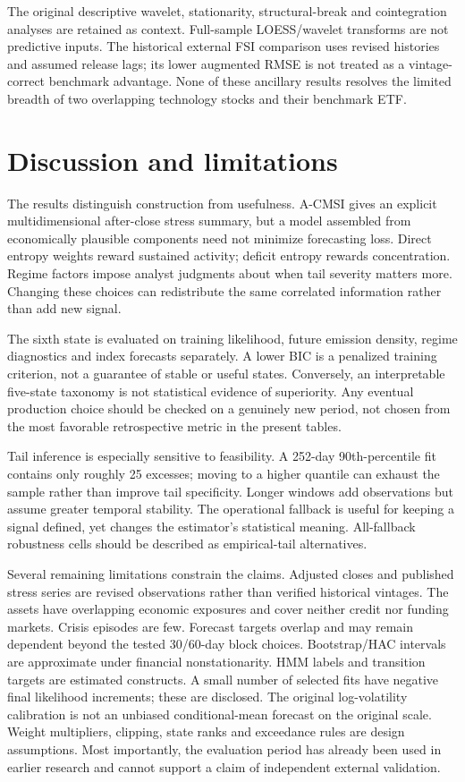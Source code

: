 \documentclass[11pt]{article}
\begin{document}
The original descriptive wavelet, stationarity, structural-break and cointegration analyses are
retained as context. Full-sample LOESS/wavelet transforms are not predictive inputs. The historical
external FSI comparison uses revised histories and assumed release lags; its lower augmented RMSE
is not treated as a vintage-correct benchmark advantage. None of these ancillary results resolves
the limited breadth of two overlapping technology stocks and their benchmark ETF.

\section{Discussion and limitations}
The results distinguish construction from usefulness. A-CMSI gives an explicit multidimensional
after-close stress summary, but a model assembled from economically plausible components need not
minimize forecasting loss. Direct entropy weights reward sustained activity; deficit entropy rewards
concentration. Regime factors impose analyst judgments about when tail severity matters more.
Changing these choices can redistribute the same correlated information rather than add new signal.

The sixth state is evaluated on training likelihood, future emission density, regime diagnostics and
index forecasts separately. A lower BIC is a penalized training criterion, not a guarantee of stable
or useful states. Conversely, an interpretable five-state taxonomy is not statistical evidence of
superiority. Any eventual production choice should be checked on a genuinely new period, not chosen
from the most favorable retrospective metric in the present tables.

Tail inference is especially sensitive to feasibility. A 252-day 90th-percentile fit contains only
roughly 25 excesses; moving to a higher quantile can exhaust the sample rather than improve tail
specificity. Longer windows add observations but assume greater temporal stability. The operational
fallback is useful for keeping a signal defined, yet changes the estimator's statistical meaning.
All-fallback robustness cells should be described as empirical-tail alternatives.

Several remaining limitations constrain the claims. Adjusted closes and published stress series
are revised observations rather than verified historical vintages. The assets have overlapping
economic exposures and cover neither credit nor funding markets. Crisis episodes are few. Forecast
targets overlap and may remain dependent beyond the tested 30/60-day block choices. Bootstrap/HAC
intervals are approximate under financial nonstationarity. HMM labels and transition targets are
estimated constructs. A small number of selected fits have negative final likelihood increments;
these are disclosed. The original log-volatility calibration is not an unbiased conditional-mean
forecast on the original scale. Weight multipliers, clipping, state ranks and exceedance rules
are design assumptions. Most importantly, the evaluation period has already been used in earlier
research and cannot support a claim of independent external validation.
\end{document}
